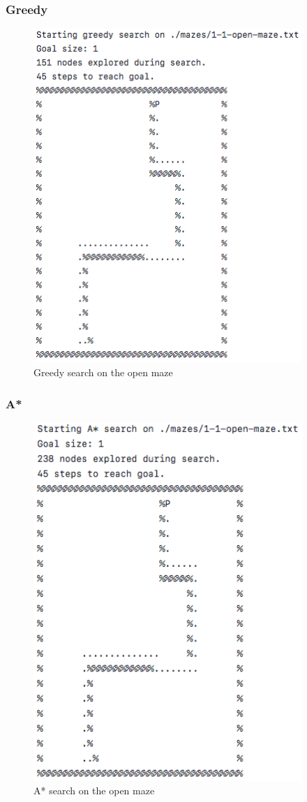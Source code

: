 \documentclass[titlepage]{article}
\begin{document}
\newpage

\subsubsection*{Greedy}
\begin{figure}[h!]
\centering
\includegraphics[width=4in]{greedyopen.png}
\caption{Greedy search on the open maze}
\label{fig:Greedyopen}
\end{figure}


\newpage

\subsubsection*{A*}
\begin{figure}[h!]
\centering
\includegraphics[width=4in]{astaropen.png}
\caption{A* search on the open maze}
\label{fig:astaropen}
\end{figure}
\end{document}
